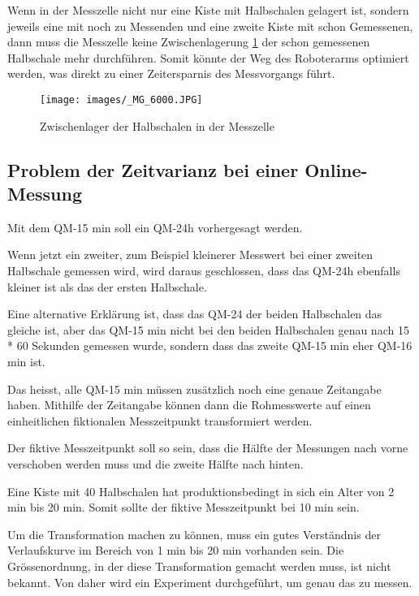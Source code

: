 Wenn in der Messzelle nicht nur eine Kiste mit Halbschalen gelagert ist, sondern jeweils eine mit noch zu Messenden und eine zweite Kiste mit schon Gemessenen, dann muss die Messzelle keine Zwischenlagerung \ref{fig:ZwischL} der schon gemessenen Halbschale mehr durchführen. Somit könnte der Weg des Roboterarms optimiert werden, was direkt zu einer Zeitersparnis des Messvorgangs führt.

\begin{figure}%
   
  \texttt{[image: images/\_MG\_6000.JPG]}
  \caption{Zwischenlager der Halbschalen in der Messzelle}
  \label{fig:ZwischL}
\end{figure}

\newpage

\subsection{Problem der Zeitvarianz bei einer Online-Messung}
\label{qmTransformation}

Mit dem QM-15 min soll ein QM-24h vorhergesagt werden.

Wenn jetzt ein zweiter, zum Beispiel kleinerer Messwert bei einer zweiten Halbschale gemessen wird, wird daraus geschlossen, dass das QM-24h ebenfalls kleiner ist als das der ersten Halbschale.

Eine alternative Erklärung ist, dass das QM-24 der beiden Halbschalen das gleiche ist, aber das QM-15 min nicht bei den beiden Halbschalen genau nach 15 * 60 Sekunden gemessen wurde, sondern dass das zweite QM-15 min eher QM-16 min ist.

Das heisst, alle QM-15 min müssen zusätzlich noch eine genaue Zeitangabe haben. Mithilfe der Zeitangabe können dann die Rohmesswerte auf einen einheitlichen fiktionalen Messzeitpunkt transformiert werden.

Der fiktive Messzeitpunkt soll so sein, dass die Hälfte der Messungen nach vorne verschoben werden muss und die zweite Hälfte nach hinten.

Eine Kiste mit 40 Halbschalen hat produktionsbedingt in sich ein Alter von 2 min bis 20 min. Somit sollte der fiktive Messzeitpunkt bei 10 min sein.

Um die Transformation machen zu können, muss ein gutes Verständnis der Verlaufskurve im Bereich von 1 min bis 20 min vorhanden sein. Die Grössenordnung, in der diese Transformation gemacht werden muss, ist nicht bekannt. Von daher wird ein Experiment durchgeführt, um genau das zu messen.

